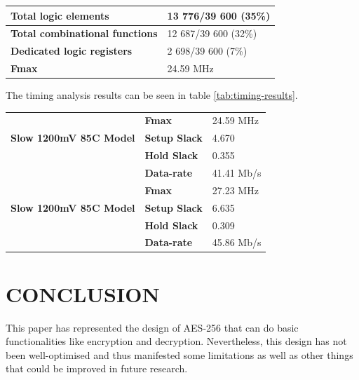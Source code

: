 \documentclass[a4paper, 10pt]{article}
\begin{document}
\begin{multicols}{2}
        \noindent
	\begin{center}
		\label{tab:aes-256}
                    \begin{tabular}{| m{5.5cm} | m{3cm} |}
		\hline   
		\textbf{Total logic elements} & 13 776/39 600 (35\%)\\
                        \hline
                        \textbf{Total combinational functions} & 12 687/39 600 (32\%)\\
                        \hline
                        \textbf{Dedicated logic registers} & 2 698/39 600 (7\%)\\
                        \hline
				\textbf{Fmax} & 24.59 MHz\\
				\hline
                    \end{tabular}
	\end{center}

	The timing analysis results can be seen in table \ref{tab:timing-results}.

	\noindent
	\begin{center}
		\label{tab:timing-results}
                    \begin{tabular}{| m{4cm} | m{2cm} | m{2cm} |}
		\hline   
		 & \textbf{Fmax} & 24.59 MHz \\
		 \textbf{Slow 1200mV 85C Model}& \textbf{Setup Slack} & 4.670 \\
									    & \textbf{Hold Slack} & 0.355 \\
									    & \textbf{Data-rate} & 41.41 Mb/s \\
                        \hline
		 & \textbf{Fmax} & 27.23 MHz \\
		 \textbf{Slow 1200mV 85C Model}& \textbf{Setup Slack} & 6.635 \\
									    & \textbf{Hold Slack} & 0.309 \\
									    & \textbf{Data-rate} & 45.86 Mb/s \\
				\hline
                    \end{tabular}
	\end{center}

        \section{CONCLUSION}

        This paper has represented the design of AES-256 that can do basic functionalities like encryption and decryption. Nevertheless, this design has not been well-optimised and thus manifested some limitations as well as other things that could be improved in future research.


\end{multicols}
\end{document}
